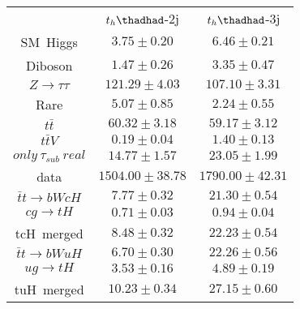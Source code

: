 \centering
\begin{tabular}{ccc} \toprule\toprule
 & $t_{h}\thadhad$-2j & $t_{h}\thadhad$-3j\\
SM~Higgs & $3.75\pm0.20$ & $6.46\pm0.21$\\
Diboson & $1.47\pm0.26$ & $3.35\pm0.47$\\
$Z\to\tau\tau$ & $121.29\pm4.03$ & $107.10\pm3.31$\\
Rare & $5.07\pm0.85$ & $2.24\pm0.55$\\
$t\bar{t}$ & $60.32\pm3.18$ & $59.17\pm3.12$\\
$t\bar{t}V$ & $0.19\pm0.04$ & $1.40\pm0.13$\\
$only~\tau_{sub}~real$ & $14.77\pm1.57$ & $23.05\pm1.99$\\
data & $1504.00\pm38.78$ & $1790.00\pm42.31$\\
$\bar{t}t\to bWcH$ & $7.77\pm0.32$ & $21.30\pm0.54$\\
$cg\to tH$ & $0.71\pm0.03$ & $0.94\pm0.04$\\
tcH~merged & $8.48\pm0.32$ & $22.23\pm0.54$\\
$\bar{t}t\to bWuH$ & $6.70\pm0.30$ & $22.26\pm0.56$\\
$ug\to tH$ & $3.53\pm0.16$ & $4.89\pm0.19$\\
tuH~merged & $10.23\pm0.34$ & $27.15\pm0.60$\\
\bottomrule\bottomrule
\end{tabular}
